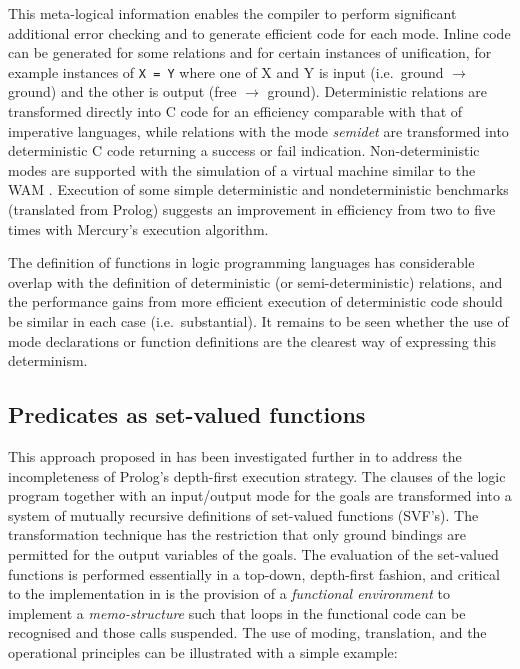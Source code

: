 This meta-logical information enables the compiler to perform significant additional error
checking and to generate efficient code for each mode.  Inline code can be generated for some
relations and for certain instances of unification, for example instances of 
\texttt{X = Y} where one of X and Y is input (i.e.\ ground $\rightarrow$ ground) and the other is
output (free $\rightarrow$ ground).  Deterministic relations are transformed directly into C code for
an efficiency comparable with that of imperative languages, while relations with
the mode \textit{semidet}
are transformed into deterministic C code returning a success or fail indication.
Non-deterministic modes are supported with the simulation of a virtual machine similar to
the WAM \cite{AK90}.  Execution of some simple deterministic and nondeterministic benchmarks
(translated from Prolog) suggests an improvement in efficiency from two to five times with
Mercury's execution algorithm.

The definition of functions in logic programming languages has considerable overlap with the
definition of deterministic (or semi-deterministic) relations, and the performance gains from
more efficient execution of deterministic code should be similar in each case (i.e.\ substantial).  It remains to be seen whether the use of mode declarations or
function definitions are the clearest way of expressing this determinism.

\subsection{Predicates as set-valued functions}

This approach proposed in \cite{Red84} has been investigated further in \cite{CSA87} to
address the incompleteness of Prolog's depth-first execution strategy.  The clauses of the
logic program together with an input/output mode for the goals are transformed into a
system of mutually recursive definitions of set-valued functions (SVF's). The transformation technique
has the restriction that only ground bindings are permitted for the output variables of the
goals.  The evaluation of the set-valued functions is performed essentially in a top-down,
depth-first fashion, and critical to the implementation in \cite{CSA87} is the provision
of a \textit{functional environment} to implement a \textit{memo-structure} such that loops in
the functional code can be recognised and those calls suspended.  The use of moding,
translation, and the operational principles can be illustrated with a simple example:

